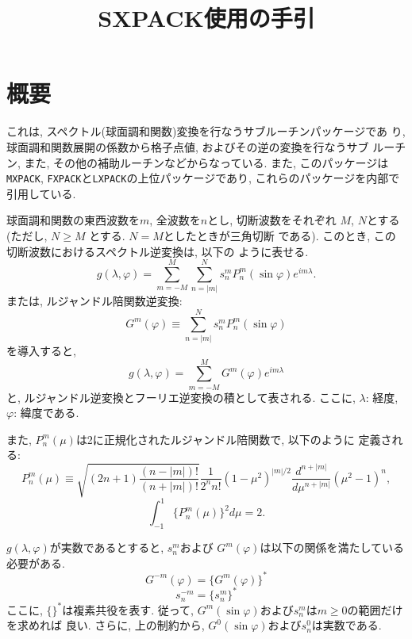 \documentclass[a4j]{jsarticle}
\title{SXPACK使用の手引}
\author{}
\date{}
\begin{document}
\maketitle

\section{概要}

これは, スペクトル(球面調和関数)変換を行なうサブルーチンパッケージであ
り, 球面調和関数展開の係数から格子点値, およびその逆の変換を行なうサブ
ルーチン, また, その他の補助ルーチンなどからなっている. 
また, このパッケージは\texttt{MXPACK},
\texttt{FXPACK}と\texttt{LXPACK}の上位パッケージであり, 
これらのパッケージを内部で引用している.

球面調和関数の東西波数を$m$, 全波数を$n$とし, 切断波数をそれぞれ
$M$, $N$とする(ただし, $N\ge M$ とする. $N=M$としたときが三角切断
である). このとき, この切断波数におけるスペクトル逆変換は, 以下の
ように表せる.
\begin{equation}
g(\lambda,\varphi)=\sum^M_{m=-M}\sum^N_{n=|m|}
s^m_nP^m_n(\sin\varphi)e^{im\lambda}.
\end{equation}
または, ルジャンドル陪関数逆変換:
\begin{equation}
G^m(\varphi)\equiv\sum^N_{n=|m|}s^m_nP^m_n(\sin\varphi)
\end{equation}
を導入すると, 
\begin{equation}
g(\lambda,\varphi)=\sum^M_{m=-M}G^m(\varphi)e^{im\lambda}
\end{equation}
と, ルジャンドル逆変換とフーリエ逆変換の積として表される.
ここに, $\lambda$: 経度, $\varphi$: 緯度である.

また, $P^m_n(\mu)$は2に正規化されたルジャンドル陪関数で, 以下のように
定義される:
\begin{equation}
P^m_n(\mu)\equiv\sqrt{(2n+1)\frac{(n-|m|)!}{(n+|m|)!}}
\frac1{2^nn!}(1-\mu^2)^{|m|/2}
\frac{d^{n+|m|}}{d\mu^{n+|m|}}(\mu^2-1)^n,
\end{equation}
\begin{equation}
\int^1_{-1}\{P^m_n(\mu)\}^2d\mu=2.
\end{equation}

$g(\lambda,\varphi)$が実数であるとすると, $s^m_n$および
$G^m(\varphi)$は以下の関係を満たしている必要がある.
\begin{equation}
G^{-m}(\varphi)=\{G^m(\varphi)\}^{*}
\end{equation}
\begin{equation}
s^{-m}_n=\{s^m_n\}^{*}
\end{equation}
ここに, $\{ \}^{*}$は複素共役を表す.
従って, $G^m(\sin\varphi)$および$s^m_n$は$m\ge 0$の範囲だけを求めれば
良い. さらに, 上の制約から, $G^0(\sin\varphi)$および$s^0_n$は実数である.
\end{document}
